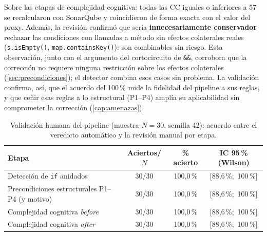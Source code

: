 Sobre las etapas de complejidad cognitiva: todas las CC iguales o inferiores a
57 se recalcularon con SonarQube y coincidieron de forma exacta con el
valor del proxy. Además, la revisión confirmó que sería
\textbf{innecesariamente conservador} rechazar las condiciones con llamadas a
método sin efectos colaterales reales (\lstinline|s.isEmpty()|,
\lstinline|map.containsKey()|): son combinables sin riesgo. Esta observación,
junto con el argumento del cortocircuito de \lstinline|&&|, corrobora que la
corrección no requiere ninguna restricción sobre los efectos colaterales
(\autoref{sec:precondiciones}); el detector combina esos casos sin problema. La
validación confirma, así, que el acuerdo del 100\,\% mide la fidelidad del
pipeline a sus reglas, y que ceñir esas reglas a lo estructural (P1--P4) amplía
su aplicabilidad sin comprometer la corrección (\autoref{cap:amenazas}).

\begin{table}[ht]
\centering
\caption{Validación humana del pipeline (muestra $N=30$, semilla 42):
acuerdo entre el veredicto automático y la revisión manual por etapa.}
\label{tab:validacion-humana}
\begin{tabular}{@{}lccc@{}}
\toprule
\textbf{Etapa} & \textbf{Aciertos/$N$} & \textbf{\% acierto} & \textbf{IC 95\,\% (Wilson)} \\
\midrule
Detección de \lstinline|if| anidados      & 30/30 & 100{,}0\,\% & [88{,}6\,\%;\ 100\,\%] \\
Precondiciones estructurales P1--P4 (y motivo) & 30/30 & 100{,}0\,\% & [88{,}6\,\%;\ 100\,\%] \\
Complejidad cognitiva \emph{before}       & 30/30 & 100{,}0\,\% & [88{,}6\,\%;\ 100\,\%] \\
Complejidad cognitiva \emph{after}        & 30/30 & 100{,}0\,\% & [88{,}6\,\%;\ 100\,\%] \\
\bottomrule
\end{tabular}
\end{table}

